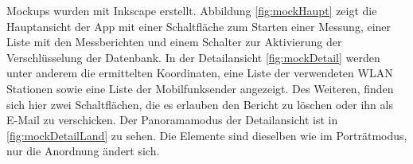 Mockups wurden mit Inkscape erstellt. Abbildung \ref{fig:mockHaupt} zeigt die Hauptansicht der App mit einer Schaltfläche zum Starten einer Messung, einer Liste mit den Messberichten und einem Schalter zur Aktivierung der Verschlüsselung der Datenbank. In der Detailansicht \ref{fig:mockDetail} werden unter anderem die ermittelten Koordinaten, eine Liste der verwendeten WLAN Stationen sowie eine Liste der Mobilfunksender angezeigt. Des Weiteren, finden sich hier zwei Schaltflächen, die es erlauben den Bericht zu löschen oder ihn als E-Mail zu verschicken. Der Panoramamodus der Detailansicht ist in \ref{fig:mockDetailLand} zu sehen. Die Elemente sind dieselben wie im Porträtmodus, nur die Anordnung ändert sich.